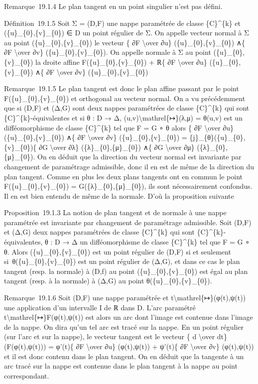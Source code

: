 \documentclass[]{article}
\begin{document}
Remarque~19.1.4 Le plan tangent en un point singulier n'est pas défini.

Définition~19.1.5 Soit Σ = (D,F) une nappe paramétrée de classe
\{C\}\^{}\{k\} et (\{u\}\_\{0\},\{v\}\_\{0\}) ∈ D un point régulier de
Σ. On appelle vecteur normal à Σ au point (\{u\}\_\{0\},\{v\}\_\{0\}) le
vecteur \{ ∂F \textbackslash{}over ∂u\} (\{u\}\_\{0\},\{v\}\_\{0\}) ∧\{
∂F \textbackslash{}over ∂v\} (\{u\}\_\{0\},\{v\}\_\{0\}). On appelle
normale à Σ au point (\{u\}\_\{0\},\{v\}\_\{0\}) la droite affine
F(\{u\}\_\{0\},\{v\}\_\{0\}) + ℝ\{ ∂F \textbackslash{}over ∂u\}
(\{u\}\_\{0\},\{v\}\_\{0\}) ∧\{ ∂F \textbackslash{}over ∂v\}
(\{u\}\_\{0\},\{v\}\_\{0\})

Remarque~19.1.5 Le plan tangent est donc le plan affine passant par le
point F(\{u\}\_\{0\},\{v\}\_\{0\}) et orthogonal au vecteur normal. On a
vu précédemment que si (D,F) et (Δ,G) sont deux nappes paramétrées de
classe \{C\}\^{}\{k\} qui sont \{C\}\^{}\{k\}-équivalentes et si θ : D →
Δ, (u,v)\textbackslash{}mathrel\{↦\}(λ,μ) = θ(u,v) est un
difféomorphisme de classe \{C\}\^{}\{k\} tel que F = G ∘ θ alors \{ ∂F
\textbackslash{}over ∂u\} (\{u\}\_\{0\},\{v\}\_\{0\}) ∧\{ ∂F
\textbackslash{}over ∂v\} (\{u\}\_\{0\},\{v\}\_\{0\}) =
\{j\}\_\{θ\}(\{u\}\_\{0\},\{v\}\_\{0\})\{ ∂G \textbackslash{}over ∂λ\}
(\{λ\}\_\{0\},\{μ\}\_\{0\}) ∧\{ ∂G \textbackslash{}over ∂μ\}
(\{λ\}\_\{0\},\{μ\}\_\{0\}). On en déduit que la direction du vecteur
normal est invariante par changement de paramétrage admissible, donc il
en est de même de la direction du plan tangent. Comme en plus les deux
plans tangents ont en commun le point F(\{u\}\_\{0\},\{v\}\_\{0\}) =
G(\{λ\}\_\{0\},\{μ\}\_\{0\}), ils sont nécessairement confondus. Il en
est bien entendu de même de la normale. D'où la proposition suivante

Proposition~19.1.3 La notion de plan tangent et de normale à une nappe
paramétrée est invariante par changement de paramétrage admissible. Soit
(D,F) et (Δ,G) deux nappes paramétrées de classe \{C\}\^{}\{k\} qui sont
\{C\}\^{}\{k\}-équivalentes, θ : D → Δ un difféomorphisme de classe
\{C\}\^{}\{k\} tel que F = G ∘ θ. Alors (\{u\}\_\{0\},\{v\}\_\{0\}) est
un point régulier de (D,F) si et seulement
si~θ(\{u\}\_\{0\},\{v\}\_\{0\}) est un point régulier de (Δ,G), et dans
ce cas le plan tangent (resp. la normale) à (D,f) au point
(\{u\}\_\{0\},\{v\}\_\{0\}) est égal au plan tangent (resp. à la
normale) à (Δ,G) au point θ(\{u\}\_\{0\},\{v\}\_\{0\}).

Remarque~19.1.6 Soit (D,F) une nappe paramétrée et
t\textbackslash{}mathrel\{↦\}(φ(t),ψ(t)) une application d'un intervalle
I de ℝ dans D. L'arc paramétré t\textbackslash{}mathrel\{↦\}F(φ(t),ψ(t))
est alors un arc dont l'image est contenue dans l'image de la nappe. On
dira qu'un tel arc est tracé sur la nappe. En un point régulier (sur
l'arc et sur la nappe), le vecteur tangent est le vecteur \{ d
\textbackslash{}over dt\} (F(φ(t),ψ(t))) = φ'(t)\{ ∂F
\textbackslash{}over ∂u\} (φ(t),ψ(t)) + ψ'(t)\{ ∂F \textbackslash{}over
∂v\} (φ(t),ψ(t)) et il est donc contenu dans le plan tangent. On en
déduit que la tangente à un arc tracé sur la nappe est contenue dans le
plan tangent à la nappe au point correspondant.
\end{document}
